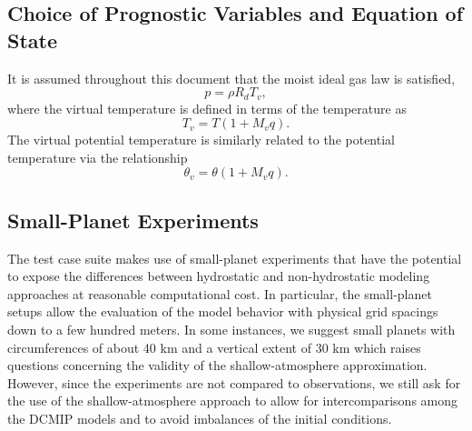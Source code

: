 \documentclass[times,doublespace]{fldauth}
\begin{document}
\subsection{Choice of Prognostic Variables and Equation of State}

It is assumed throughout this document that the moist ideal gas law is satisfied,
\begin{equation} \label{eq:idealgaslaw}
p = \rho R_d T_v, 
\end{equation} where the virtual temperature is defined in terms of the temperature as
\begin{equation} \label{eq:virtualtemperature}
T_v = T (1 + M_v q).
\end{equation}  The virtual potential temperature is similarly related to the potential temperature via the relationship
\begin{equation}
\theta_v = \theta (1 + M_v q).
\end{equation}

\subsection{Small-Planet Experiments}
The test case suite makes use of small-planet experiments that have the potential to expose the differences between hydrostatic and non-hydrostatic modeling approaches at reasonable computational cost. In particular, the small-planet setups allow the evaluation of the model behavior with physical grid spacings down to a few hundred meters. In some instances, we suggest small planets with circumferences of about 40 km and a vertical extent of 30 km which raises questions concerning the validity of the shallow-atmosphere approximation. However, since the experiments are not compared to observations, we still ask for the use of the shallow-atmosphere approach to allow for intercomparisons among the DCMIP models and to avoid imbalances of the initial conditions.
\end{document}
